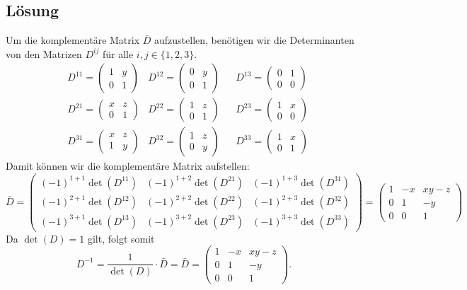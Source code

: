 \subsection*{L\"osung}
Um die komplementäre Matrix $\bar D$ aufzustellen, benötigen wir die Determinanten von den Matrizen $D^{ij}$ für alle $i,j\in \{1,2,3\}$.
\begin{align*}
&D^{11}=\begin{pmatrix}
		1	&y	\\
		0	&1
	\end{pmatrix}
&D^{12}=\begin{pmatrix}
		0	&y	\\
		0	&1
	\end{pmatrix}
&&D^{13}=\begin{pmatrix}
		0	&1	\\
		0	&0
	\end{pmatrix}\\
%
&D^{21}=\begin{pmatrix}
		x	&z	\\
		0	&1
	\end{pmatrix}
&D^{22}=\begin{pmatrix}
		1	&z	\\
		0	&1
	\end{pmatrix}
&&D^{23}=\begin{pmatrix}
		1	&x	\\
		0	&0
	\end{pmatrix}\\
%
&D^{31}=\begin{pmatrix}
		x	&z	\\
		1	&y
	\end{pmatrix}
&D^{32}=\begin{pmatrix}
		1	&z	\\
		0	&y
	\end{pmatrix}
&&D^{33}=\begin{pmatrix}
		1	&x	\\
		0	&1
	\end{pmatrix}
\end{align*}
Damit können wir die komplementäre Matrix aufstellen:
$$
\bar D=\begin{pmatrix}
		(-1)^{1+1}\det(D^{11})	&(-1)^{1+2}\det(D^{21})	&(-1)^{1+3}\det(D^{31}) \\
		(-1)^{2+1}\det(D^{12})	&(-1)^{2+2}\det(D^{22})	&(-1)^{2+3}\det(D^{32}) \\
		(-1)^{3+1}\det(D^{13})	&(-1)^{3+2}\det(D^{23})	&(-1)^{3+3}\det(D^{33}) 
	\end{pmatrix}
	= 
	\begin{pmatrix}
	1 & -x & xy-z \\
	0 & 1 & -y \\
	0 & 0& 1
	\end{pmatrix}
$$
Da $\det(D)=1$ gilt, folgt somit 
$$
D^{-1}=\frac{1}{\det(D)}\cdot \bar D = \bar D= \begin{pmatrix}
	1 & -x & xy-z \\
	0 & 1 & -y \\
	0 & 0& 1
	\end{pmatrix}.
$$
\newpage
